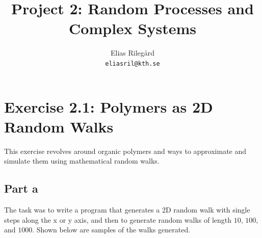 \documentclass[a4paper,12pt]{article}
\title{Project 2: Random Processes and Complex Systems}
\author{
  Elias Rilegård\\
  \texttt{eliasril@kth.se}
}
\begin{document}
\maketitle

\section*{Exercise 2.1: Polymers as 2D Random Walks}

This exercise revolves around organic polymers and ways to approximate and simulate them using mathematical random
walks.

\subsection*{Part a}

The task was to write a program that generates a 2D random walk with single steps along the x or y axis, and then
to generate random walks of length $10$, $100$, and $1000$. Shown below are samples of the walks generated.
\end{document}
